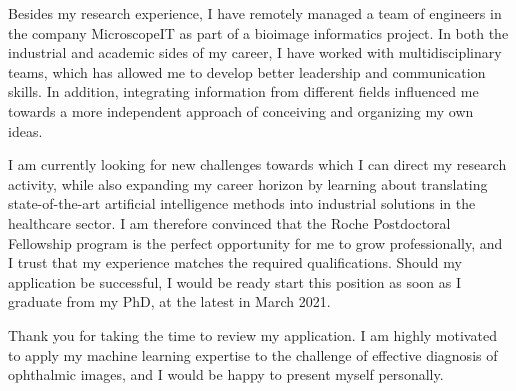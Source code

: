 \documentclass[10pt, letter]{ag-cv} %
\begin{document}
\begin{cvletter}
\begin{flushleft}
Besides my research experience, I have remotely managed a team of engineers in the company MicroscopeIT as part of a bioimage informatics project. In both the industrial and academic sides of my career, I have worked with multidisciplinary teams, which has allowed me to develop better leadership and communication skills. In addition, integrating information from different fields influenced me towards a more independent approach of conceiving and organizing my own ideas. 

I am currently looking for new challenges towards which I can direct my research activity, while also expanding my career horizon by learning about translating state-of-the-art artificial intelligence methods into industrial solutions in the healthcare sector. I am therefore convinced that the Roche Postdoctoral Fellowship program is the perfect opportunity for me to grow professionally, and I trust that my experience matches the required qualifications. Should my application be successful, I would be ready start this position as soon as I graduate from my PhD, at the latest in March 2021. 

Thank you for taking the time to review my application. I am highly motivated to apply my machine learning expertise to the challenge of effective diagnosis of ophthalmic images, and I would be happy to present myself personally. 


\end{flushleft}

\end{cvletter}


\makeletterclosing %
\end{document}

